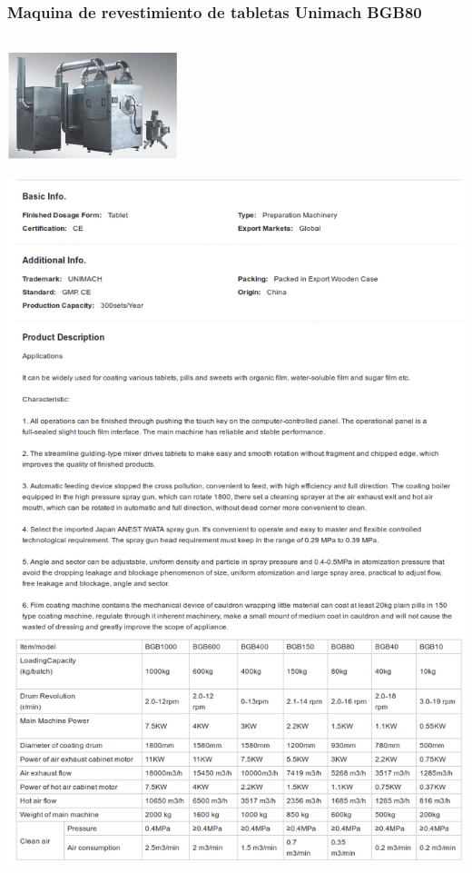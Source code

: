 \subsubsection{Maquina de revestimiento de tabletas Unimach BGB80}
\includegraphics[width=5cm,height=4cm,keepaspectratio]{Datasheets/4Foto.png} 
\\
\includegraphics[width=15cm,height=20cm,keepaspectratio]{Datasheets/4MaquinaRevestimiento.png} 
\newpage

